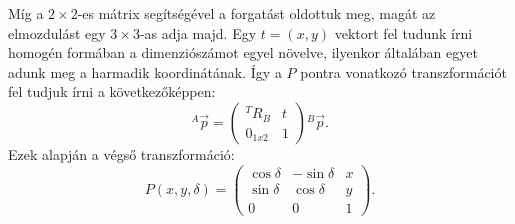 Míg a $2 \times 2$-es mátrix segítségével a forgatást oldottuk meg, magát az elmozdulást egy $3 \times 3$-as adja majd. Egy $t = (x, y)$ vektort fel tudunk írni homogén formában a dimenziószámot egyel növelve, ilyenkor általában egyet adunk meg a harmadik koordinátának. Így a $P$ pontra vonatkozó transzformációt fel tudjuk írni a következőképpen:
\[
{}^{A}\vec{p} =
\begin{pmatrix}
{}^{T}R{}_{B} & t\\
0_{1x2} & 1
\end{pmatrix}
{}^{B}\vec{p}.
\]
Ezek alapján a végső transzformáció:
\[
P(x, y, \delta) =
\begin{pmatrix}
\cos\delta & -\sin\delta & x\\
\sin\delta & \cos\delta & y\\
0 & 0 & 1
\end{pmatrix}.
\]
